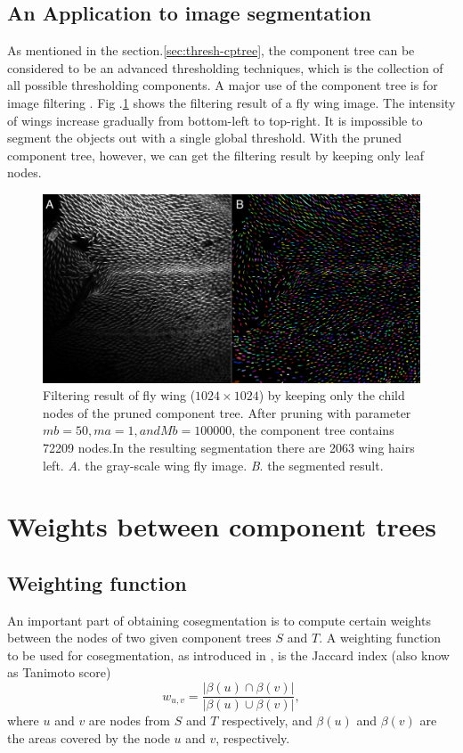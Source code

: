 \subsection{ An Application to image segmentation} \label{sec:cptree-applic}
As mentioned in the section.\ref{sec:thresh-cptree}, the component tree can be  considered to be an advanced thresholding techniques, which is the collection of all possible thresholding components. A major use of the component tree is for image filtering \cite{najman2006building}. Fig .\ref{fig:cptree-flywing} shows the filtering result of a fly wing image. The intensity of wings increase gradually from bottom-left to top-right. It is impossible to segment the objects out with a single global  threshold. With the pruned component tree, however, we can get the filtering result by keeping only leaf nodes.

\begin{figure}[htbp]
\centering
\includegraphics[width=1.0\textwidth]{images/cptree_flywing}
\caption[Filtering result of fly wing by keeping only the child nodes of the pruned component tree]{Filtering result of fly wing ($1024\times1024$) by keeping only the child nodes of the pruned component tree. After pruning with parameter $mb = 50, ma = 1, and Mb = 100000$, the component tree contains 72209 nodes.In the resulting segmentation there are 2063 wing hairs left. \emph{A}. the gray-scale wing fly image. \emph{B}. the segmented result.}
\label{fig:cptree-flywing}
\end{figure}

\section{Weights between component trees} \label{sec:cptree-weight}
\subsection{Weighting function}
An important part of obtaining cosegmentation is to compute certain weights between the nodes of two given component trees $S$ and $T$. A weighting function to be used for cosegmentation, as introduced in \cite{Xiao:2011, xiao2011dynamic}, is the Jaccard index (also know as Tanimoto score)
$$
w_{u,v} = \frac{|\beta(u) \cap \beta(v)|}{|\beta(u) \cup \beta(v)|},
$$
where $u$ and $v$ are nodes from $S$ and $T$ respectively, and $\beta(u)$ and $\beta(v)$ are the areas covered by the node $u$ and $v$, respectively.

